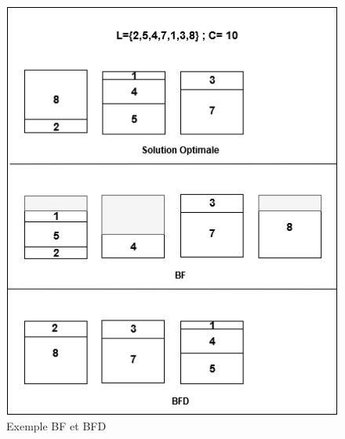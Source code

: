\documentclass[class=article, crop=false]{standalone}
\begin{document}
\begin{figure}[H]
    \includegraphics[width=\linewidth]{../figures/BF BFD.png}
    \caption{Exemple BF et BFD}
\end{figure}
\newpage
\end{document}
